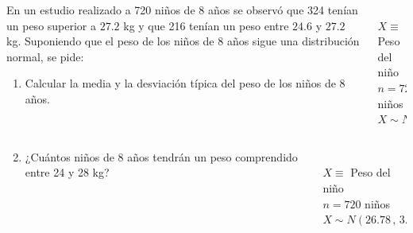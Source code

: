 \documentclass[aspectratio=149,10pt,xcolor=dvipsnames,t]{beamer}
\begin{document}
	
\begin{frame}
\begin{columns}
\begin{column}[T]{0.75\textwidth}
En un estudio realizado a 720 niños de 8 años se observó que 324 tenían un peso superior a $27.2$ kg y que 216
tenían un peso entre $24.6$ y $27.2$ kg.
Suponiendo que el peso de los niños de 8 años sigue una distribución normal, se pide:
\begin{enumerate}
  \item Calcular la media y la desviación típica del peso de los niños de 8 años.
\end{enumerate}
\end{column}
\begin{column}[T]{0.25\textwidth}
\\
$X\equiv$ Peso del niño\\
$n=720$ niños\\
$X\sim N(\mu,\sigma)$
\end{column}
\end{columns} 
\end{frame}
	
	
\begin{frame}
\begin{columns}
\begin{column}[T]{0.75\textwidth}
\begin{enumerate}
\setcounter{enumi}{1}
\item ¿Cuántos niños de 8 años tendrán un peso comprendido entre 24 y 28 kg?
\end{enumerate}
\end{column}
\begin{column}[T]{0.25\textwidth}
\\
$X\equiv$ Peso del niño\\
$n=720$ niños\\
$X\sim N(26.78\,,\,3.25)$
\end{column}
\end{columns} 
\end{frame}	
	
\end{document}
